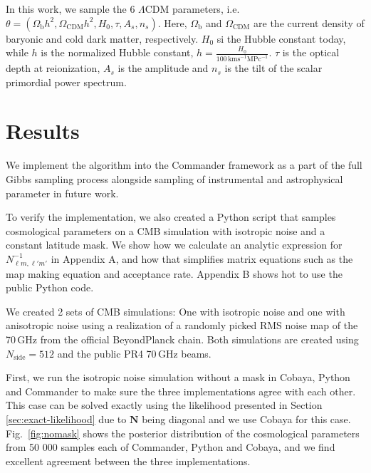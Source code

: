 \documentclass[twocolumn]{../common/aa}
\begin{document}
In this work, we sample the 6 $\Lambda$CDM parameters, i.e. $\theta=(\Omega_{\textrm{b}}h^2, \Omega_{\textrm{CDM}}h^2, H_0, \tau, A_s, n_s)$. Here, $\Omega_\mathrm{b}$ and $\Omega_\mathrm{CDM}$ are the current density of baryonic and cold dark matter, respectively. $H_0$ si the Hubble constant today, while $h$ is the normalized Hubble constant, $h=\frac{H_0}{100\,\mathrm{km s}^{-1} \mathrm{MPc}^{-1}}$. $\tau$ is the optical depth at reionization, $A_s$ is the amplitude and $n_s$ is the tilt of the scalar primordial power spectrum.


\section{Results}
\label{sec:results}

We implement the algorithm into the Commander framework as a part of the full Gibbs sampling process alongside sampling of instrumental and astrophysical parameter in future work.

To verify the implementation, we also created a Python script that samples cosmological parameters on a CMB simulation with isotropic noise and a constant latitude mask. We show how we calculate an analytic expression for $N^{-1}_{\ell m, \ell' m'}$ in Appendix A, and how that simplifies matrix equations such as the map making equation and acceptance rate. Appendix B shows hot to use the public Python code.

We created 2 sets of CMB simulations: One with isotropic noise and one with anisotropic noise using a realization of a randomly picked RMS noise map of the 70\,GHz from the official BeyondPlanck chain. Both simulations are created using $N_{\textrm{side}}=512$ and the public PR4 70\,GHz beams.

First, we run the isotropic noise simulation without a mask in Cobaya, Python and Commander to make sure the three implementations agree with each other. This case can be solved exactly using the likelihood presented in Section \ref{sec:exact-likelihood} due to $\mathbf{N}$ being diagonal and we use Cobaya\cite{cobaya} for this case. Fig.~\ref{fig:nomask} shows the posterior distribution of the cosmological parameters from 50 000 samples each of Commander, Python and Cobaya, and we find excellent agreement between the three implementations.
\end{document}
